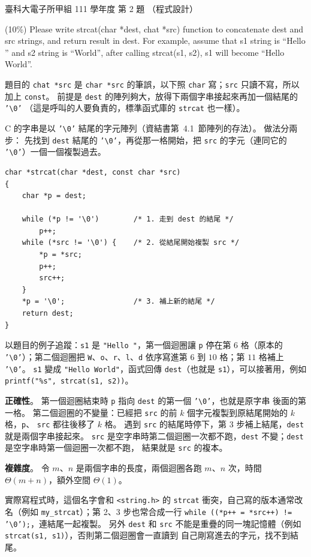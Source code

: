 \begin{pastexam}[label={px:ntust-111-et-ds-02}]{臺科大電子所甲組 111 學年度 第 2 題}
（程式設計）

(10\%) Please write strcat(char *dest, chat *src) function to concatenate dest and src strings, and
return result in dest. For example, assume that s1 string is ``Hello '' and s2 string is ``World'',
after calling strcat(s1, s2), s1 will become ``Hello World''.
\end{pastexam}

\begin{pastsoln}
題目的 \texttt{chat *src} 是 \texttt{char *src} 的筆誤，以下照 \texttt{char} 寫；\texttt{src} 只讀不寫，所以加上
\texttt{const}。 前提是 \texttt{dest} 的陣列夠大，放得下兩個字串接起來再加一個結尾的 \texttt{'\textbackslash 0'}
（這是呼叫的人要負責的，標準函式庫的 \texttt{strcat} 也一樣）。

C 的字串是以 \texttt{'\textbackslash 0'} 結尾的字元陣列（資結書第~4.1~節陣列的存法）。 做法分兩步：
先找到 \texttt{dest} 結尾的 \texttt{'\textbackslash 0'}，再從那一格開始，把 \texttt{src} 的字元（連同它的
\texttt{'\textbackslash 0'}）一個一個複製過去。

\begin{verbatim}
char *strcat(char *dest, const char *src)
{
    char *p = dest;

    while (*p != '\0')        /* 1. 走到 dest 的結尾 */
        p++;
    while (*src != '\0') {    /* 2. 從結尾開始複製 src */
        *p = *src;
        p++;
        src++;
    }
    *p = '\0';                /* 3. 補上新的結尾 */
    return dest;
}
\end{verbatim}

以題目的例子追蹤：\texttt{s1} 是 \texttt{"Hello "}，第一個迴圈讓 \texttt{p} 停在第 $6$ 格（原本的
\texttt{'\textbackslash 0'}）；第二個迴圈把 \texttt{W}、\texttt{o}、\texttt{r}、\texttt{l}、\texttt{d} 依序寫進第
$6$ 到 $10$ 格；第 $11$ 格補上 \texttt{'\textbackslash 0'}。 \texttt{s1} 變成 \texttt{"Hello World"}，函式回傳
\texttt{dest}（也就是 \texttt{s1}），可以接著用，例如 \texttt{printf("\%s", strcat(s1, s2))}。

\textbf{正確性}。 第一個迴圈結束時 \texttt{p} 指向 \texttt{dest} 的第一個 \texttt{'\textbackslash 0'}，也就是原字串
後面的第一格。 第二個迴圈的不變量：已經把 \texttt{src} 的前 $k$ 個字元複製到原結尾開始的 $k$ 格，\texttt{p}、
\texttt{src} 都往後移了 $k$ 格。 遇到 \texttt{src} 的結尾時停下，第 3 步補上結尾，\texttt{dest} 就是兩個字串接起來。
\texttt{src} 是空字串時第二個迴圈一次都不跑，\texttt{dest} 不變；\texttt{dest} 是空字串時第一個迴圈一次都不跑，
結果就是 \texttt{src} 的複本。

\textbf{複雜度}。 令 $m$、$n$ 是兩個字串的長度，兩個迴圈各跑 $m$、$n$ 次，時間 $\Theta(m + n)$，額外空間 $\Theta(1)$。

實際寫程式時，這個名字會和 \texttt{<string.h>} 的 \texttt{strcat} 衝突，自己寫的版本通常改名（例如
\texttt{my\_strcat}）；第 2、3 步也常合成一行 \texttt{while ((*p++ = *src++) != '\textbackslash 0');}，連結尾一起複製。
另外 \texttt{dest} 和 \texttt{src} 不能是重疊的同一塊記憶體（例如 \texttt{strcat(s1, s1)}），否則第二個迴圈會一直讀到
自己剛寫進去的字元，找不到結尾。
\end{pastsoln}
